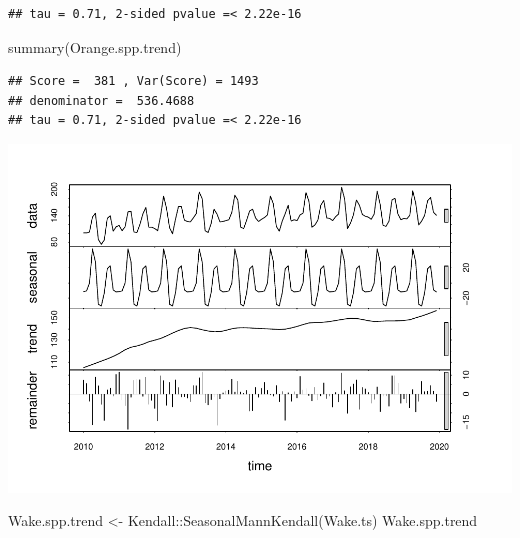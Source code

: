 \documentclass[
  12pt,
]{article}
\newenvironment{Shaded}{\begin{snugshade}}{\end{snugshade}}
\newcommand{\AttributeTok}[1]{\textcolor[rgb]{0.77,0.63,0.00}{#1}}
\newcommand{\CommentTok}[1]{\textcolor[rgb]{0.56,0.35,0.01}{\textit{#1}}}
\newcommand{\DecValTok}[1]{\textcolor[rgb]{0.00,0.00,0.81}{#1}}
\newcommand{\FunctionTok}[1]{\textcolor[rgb]{0.00,0.00,0.00}{#1}}
\newcommand{\NormalTok}[1]{#1}
\newcommand{\OtherTok}[1]{\textcolor[rgb]{0.56,0.35,0.01}{#1}}
\newcommand{\SpecialCharTok}[1]{\textcolor[rgb]{0.00,0.00,0.00}{#1}}
\newcommand{\StringTok}[1]{\textcolor[rgb]{0.31,0.60,0.02}{#1}}
\begin{document}
\begin{verbatim}
## tau = 0.71, 2-sided pvalue =< 2.22e-16
\end{verbatim}

\begin{Shaded}
\begin{Highlighting}[]
\FunctionTok{summary}\NormalTok{(Orange.spp.trend)}
\end{Highlighting}
\end{Shaded}

\begin{verbatim}
## Score =  381 , Var(Score) = 1493
## denominator =  536.4688
## tau = 0.71, 2-sided pvalue =< 2.22e-16
\end{verbatim}

\begin{Shaded}
\end{Shaded}

\includegraphics{Project_Template_files/figure-latex/county SPP TS-3.pdf}

\begin{Shaded}
\begin{Highlighting}[]
\NormalTok{Wake.spp.trend }\OtherTok{\textless{}{-}}\NormalTok{ Kendall}\SpecialCharTok{::}\FunctionTok{SeasonalMannKendall}\NormalTok{(Wake.ts) }
\NormalTok{Wake.spp.trend}
\end{Highlighting}
\end{Shaded}
\end{document}
